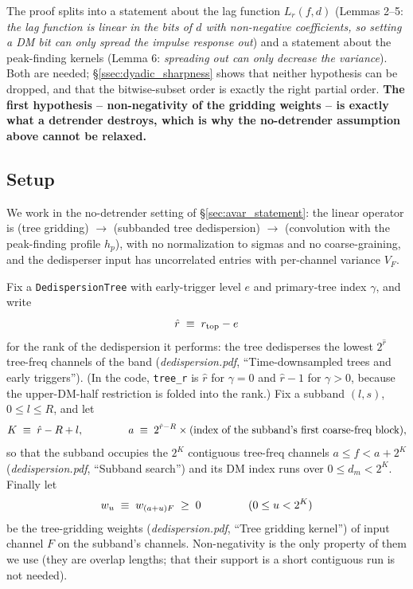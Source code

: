 \documentclass{article}
\numberwithin{equation}{section}   %
\newcommand{\ddnotes}[1]{{\em dedispersion.pdf}, ``#1''}
\begin{document}
The proof splits into a statement about the lag function $L_r(f,d)$ (Lemmas 2--5: {\em the
lag function is linear in the bits of $d$ with non-negative coefficients, so setting a DM bit
can only spread the impulse response out}) and a statement about the peak-finding kernels
(Lemma 6: {\em spreading out can only decrease the variance}). Both are needed;
\S\ref{ssec:dyadic_sharpness} shows that neither hypothesis can be dropped, and that the
bitwise-subset order is exactly the right partial order. {\bf The first hypothesis --
non-negativity of the gridding weights -- is exactly what a detrender destroys, which is
why the no-detrender assumption above cannot be relaxed.}

\subsection{Setup}
\label{ssec:dyadic_setup}

We work in the no-detrender setting of \S\ref{sec:avar_statement}: the linear operator is
(tree gridding) $\to$ (subbanded tree dedispersion) $\to$ (convolution with the peak-finding
profile $h_p$), with no normalization to sigmas and no coarse-graining, and the dedisperser
input has uncorrelated entries with per-channel variance $V_F$.

Fix a {\tt DedispersionTree} with early-trigger level $e$ and primary-tree index $\gamma$,
and write
\begin{equation}
\hat r \;\equiv\; r_{\rm top} - e
\end{equation}
for the rank of the dedispersion it performs: the tree dedisperses the lowest $2^{\hat r}$
tree-freq channels of the band (\ddnotes{Time-downsampled trees and early triggers}). (In the code, {\tt tree\_r}
is $\hat r$ for $\gamma = 0$ and $\hat r - 1$ for $\gamma > 0$, because the upper-DM-half
restriction is folded into the rank.) Fix a subband $(l,s)$, $0 \le l \le R$, and let
\begin{equation}
K \;\equiv\; \hat r - R + l,
  \hspace{1.5cm}
a \;\equiv\; 2^{\hat r - R} \times (\mbox{index of the subband's first coarse-freq block}),
\end{equation}
so that the subband occupies the $2^K$ contiguous tree-freq channels $a \le f < a+2^K$
(\ddnotes{Subband search}) and its DM index runs over
$0 \le d_m < 2^K$. Finally let
\begin{equation}
w_u \;\equiv\; w_{(a+u)F} \;\ge\; 0
  \hspace{1.5cm} (0 \le u < 2^K)
\end{equation}
be the tree-gridding weights (\ddnotes{Tree gridding kernel}) of input channel $F$ on the subband's
channels. Non-negativity is the only property of them we use (they are overlap lengths; that
their support is a short contiguous run is not needed).
\end{document}
